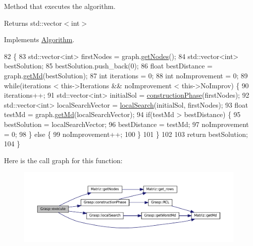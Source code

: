 Method that executes the algorithm. 

\begin{DoxyReturn}{Returns}
std\+::vector$<$int$>$ 
\end{DoxyReturn}


Implements \hyperlink{classAlgorithm_af6ea9eb9a6dbd41896e3fd7dabac096b}{Algorithm}.


\begin{DoxyCode}
82                               \{
83   std::vector<int> firstNodes = graph.\hyperlink{classMatriz_a394b84a5ec13fd2f4d202ab218680afe}{getNodes}();
84   std::vector<int> bestSolution;
85   bestSolution.push\_back(0);
86   \textcolor{keywordtype}{float} bestDistance = graph.\hyperlink{classMatriz_a8df14a27d791f24206dd633b2a685c5b}{getMd}(bestSolution);
87   \textcolor{keywordtype}{int} iterations = 0;
88   \textcolor{keywordtype}{int} noImprovement = 0;
89   \textcolor{keywordflow}{while}(iterations < this->Iterations && noImprovement < this->NoImprov) \{
90     iterations++;
91     std::vector<int> initialSol = \hyperlink{classGrasp_aef091e71dd747ebcb78e1ebcdcf44221}{constructionPhase}(firstNodes);
92     std::vector<int> localSearchVector = \hyperlink{classGrasp_a7c5bebb4a0dea342928f66fb73a56559}{localSearch}(initialSol, firstNodes);
93     \textcolor{keywordtype}{float} testMd = graph.\hyperlink{classMatriz_a8df14a27d791f24206dd633b2a685c5b}{getMd}(localSearchVector);
94     \textcolor{keywordflow}{if}(testMd > bestDistance) \{
95       bestSolution = localSearchVector;
96       bestDistance = testMd;
97       noImprovement = 0;
98     \} \textcolor{keywordflow}{else} \{
99       noImprovement++;
100     \}
101   \}
102   
103 \textcolor{keywordflow}{return} bestSolution;
104 \}
\end{DoxyCode}
Here is the call graph for this function\+:\nopagebreak
\begin{figure}[H]
\begin{center}
\leavevmode
\includegraphics[width=350pt]{classGrasp_a335b063bccd26b434dda3a3a69d6d711_cgraph}
\end{center}
\end{figure}
